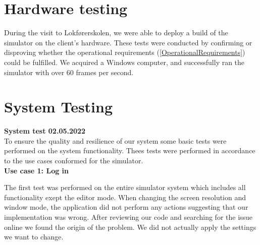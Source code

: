 \section{Hardware testing}
During the visit to Lokførerskolen, we were able to deploy a build of the simulator on the client's hardware. These tests were conducted by confirming or disproving whether the operational requirements (\ref{OperationalRequirements}) could be fulfilled. We acquired a Windows computer, and successfully ran the simulator with over 60 frames per second. 












\section{System Testing} %

\textbf{System test 02.05.2022} \\
To ensure the quality and resilience of our system some basic tests were performed on the system functionality. Thees tests were performed in accordance to the use cases conformed for the simulator. \\

\textbf{Use case 1: Log in}



The first test was performed on the entire simulator system which includes all functionality exept the editor mode. When changing the screen resolution and window mode, the application did not perform any actions suggesting that our implementation was wrong. After reviewing our code and searching for the issue online we found the origin of the problem. We did not actually apply the settings we want to change.

